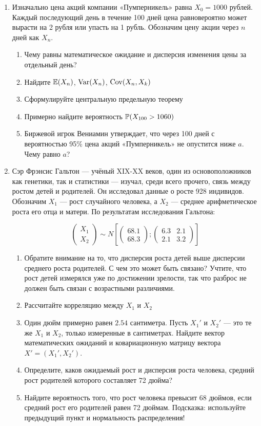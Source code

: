 \documentclass[12pt, a4paper]{article}\usepackage[]{graphicx}\usepackage[]{color}
\begin{document}
\begin{enumerate}
\item Изначально цена акций компании «Пумперникель» равна $X_0=1000$ рублей. Каждый последующий день в течение 100 дней цена равновероятно может вырасти на 2 рубля или упасть на 1 рубль. Обозначим цену акции через $n$ дней как $X_n$.
\begin{enumerate}
\item Чему равны математическое ожидание и дисперсия изменения цены за отдельный день?
\item Найдите $\E(X_n)$, $\Var(X_n)$, $\Cov(X_n, X_k)$
\item Сформулируйте центральную предельную теорему
\item Примерно найдите вероятность $\P(X_{100}>1060)$
\item Биржевой игрок Вениамин утверждает, что через 100 дней с вероятностью 95\% цена акций «Пумперникель» не опустится ниже $a$. Чему равно $a$?
\end{enumerate}
\item  Сэр Фрэнсис Гальтон —  учёный XIX-XX веков, один из основоположников как
генетики, так и статистики — изучал, среди всего прочего, связь между ростом детей и родителей.  Он исследовал данные о росте 928 индивидов. Обозначим $X_1$ — рост случайного человека, а $X_2$ — среднее арифметическое роста его отца и матери. По результатам исследования Гальтона:


\[
\begin{pmatrix}
X_1 \\
X_2
\end{pmatrix}
\sim
N\left[
\begin{pmatrix}
68.1 \\
68.3
\end{pmatrix};
\begin{pmatrix}
6.3 & 2.1 \\
2.1 & 3.2
\end{pmatrix}
\right]
\]

\begin{enumerate}
\item Обратите внимание на то, что дисперсия роста детей выше дисперсии среднего роста
родителей. С чем это
может быть связано? Учтите, что рост детей измерялся уже по достижении
зрелости, так что разброс не должен быть связан с возрастными различиями.
\item Рассчитайте корреляцию между $X_1$ и $X_2$
\item Один дюйм примерно равен $2.54$ сантиметра. Пусть $X_1'$ и $X_2'$ — это те же $X_1$ и $X_2$, только измеренные в сантиметрах. Найдите вектор математических ожиданий и ковариационную матрицу вектора $X'=(X_1', X_2')$.
\item Определите, каков ожидаемый рост и дисперсия роста человека, средний рост родителей которого составляет 72 дюйма?
\item Найдите вероятность того, что рост человека превысит 68 дюймов, если средний рост его родителей равен 72 дюймам. Подсказка: используйте предыдущий пункт и нормальность распределения!
\end{enumerate}


\end{enumerate}
\end{document}
